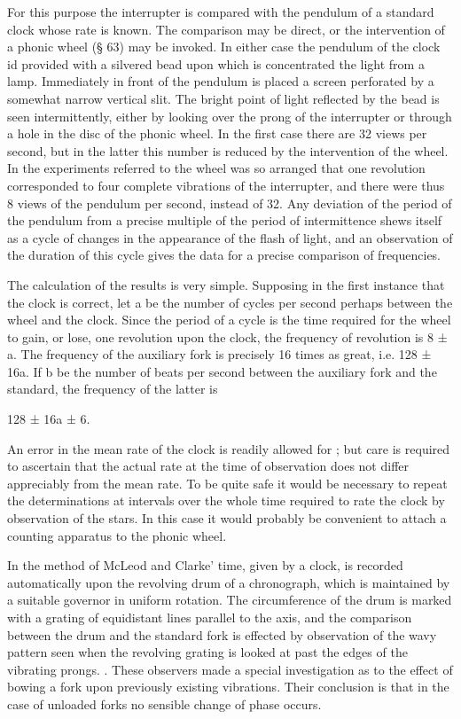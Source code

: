 For this purpose the interrupter is compared with the pendulum of a
standard clock whose rate is known. The comparison may be direct, or the
intervention of a phonic wheel (§ 63) may be invoked. In either case the
pendulum of the clock id provided with a silvered bead upon which is
concentrated the light from a lamp. Immediately in front of the pendulum
is placed a screen perforated by a somewhat narrow vertical slit. The
bright point of light reflected by the bead is seen intermittently,
either by looking over the prong of the interrupter or through a hole in
the disc of the phonic wheel. In the first case there are 32 views per
second, but in the latter this number is reduced by the intervention of
the wheel. In the experiments referred to the wheel was so arranged that
one revolution corresponded to four complete vibrations of the
interrupter, and there were thus 8 views of the pendulum per second,
instead of 32. Any deviation of the period of the pendulum from a
precise multiple of the period of intermittence shews itself as a cycle
of changes in the appearance of the flash of light, and an observation
of the duration of this cycle gives the data for a precise comparison of
frequencies.

The calculation of the results is very simple. Supposing in the first
instance that the clock is correct, let a be the number of cycles per
second perhaps between the wheel and the clock. Since the period of a
cycle is the time required for the wheel to gain, or lose, one
revolution upon the clock, the frequency of revolution is 8 ± a. The
frequency of the auxiliary fork is precisely 16 times as great, i.e. 128
± 16a. If b be the number of beats per second between the auxiliary fork
and the standard, the frequency of the latter is

128 ± 16a ± 6.

An error in the mean rate of the clock is readily allowed for ; but care
is required to ascertain that the actual rate at the time of observation
does not differ appreciably from the mean rate. To be quite safe it
would be necessary to repeat the determinations at intervals over the
whole time required to rate the clock by observation of the stars. In
this case it would probably be convenient to attach a counting apparatus
to the phonic wheel.

In the method of McLeod and Clarke' time, given by a clock, is recorded
automatically upon the revolving drum of a chronograph, which is
maintained by a suitable governor in uniform rotation. The circumference
of the drum is marked with a grating of equidistant lines parallel to
the axis, and the comparison between the drum and the standard fork is
effected by observation of the wavy pattern seen when the revolving
grating is looked at past the edges of the vibrating prongs. . These
observers made a special investigation as to the effect of bowing a fork
upon previously existing vibrations. Their conclusion is that in the
case of unloaded forks no sensible change of phase occurs.

